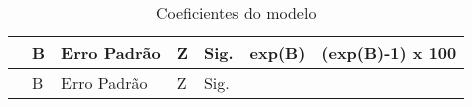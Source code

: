 \documentclass[
]{article}
\begin{document}
\begin{longtable}[]{@{}
  >{\raggedright\arraybackslash}p{}
  >{\raggedleft\arraybackslash}p{}
  >{\raggedleft\arraybackslash}p{}
  >{\raggedleft\arraybackslash}p{}
  >{\raggedleft\arraybackslash}p{}
  >{\raggedleft\arraybackslash}p{}
  >{\raggedleft\arraybackslash}p{}@{}}
\caption{Coeficientes do modelo}\tabularnewline
\toprule\noalign{}
\begin{minipage}[b]{\linewidth}\raggedright
\end{minipage} & \begin{minipage}[b]{\linewidth}\raggedleft
B
\end{minipage} & \begin{minipage}[b]{\linewidth}\raggedleft
Erro Padrão
\end{minipage} & \begin{minipage}[b]{\linewidth}\raggedleft
Z
\end{minipage} & \begin{minipage}[b]{\linewidth}\raggedleft
Sig.
\end{minipage} & \begin{minipage}[b]{\linewidth}\raggedleft
exp(B)
\end{minipage} & \begin{minipage}[b]{\linewidth}\raggedleft
(exp(B)-1) x 100
\end{minipage} \\
\midrule\noalign{}
\endfirsthead
\toprule\noalign{}
\begin{minipage}[b]{\linewidth}\raggedright
\end{minipage} & \begin{minipage}[b]{\linewidth}\raggedleft
B
\end{minipage} & \begin{minipage}[b]{\linewidth}\raggedleft
Erro Padrão
\end{minipage} & \begin{minipage}[b]{\linewidth}\raggedleft
Z
\end{minipage} & \begin{minipage}[b]{\linewidth}\raggedleft
Sig.
\end{minipage} & \begin{minipage}[b]{\linewidth}\raggedleft

\end{minipage}
\end{longtable}
\end{document}
